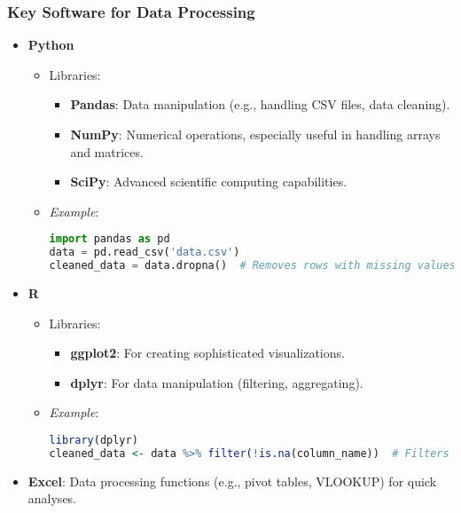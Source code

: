 \documentclass[aspectratio=169]{beamer}
\begin{document}
\begin{frame}[fragile]
    \frametitle{Key Software for Data Processing}
    \begin{itemize}
        \item \textbf{Python}
            \begin{itemize}
                \item Libraries:
                    \begin{itemize}
                        \item \textbf{Pandas}: Data manipulation (e.g., handling CSV files, data cleaning).
                        \item \textbf{NumPy}: Numerical operations, especially useful in handling arrays and matrices.
                        \item \textbf{SciPy}: Advanced scientific computing capabilities.
                    \end{itemize}
                \item \textit{Example}:
                \begin{lstlisting}[language=Python]
import pandas as pd
data = pd.read_csv('data.csv')
cleaned_data = data.dropna()  # Removes rows with missing values
                \end{lstlisting}
            \end{itemize}
        
        \item \textbf{R}
            \begin{itemize}
                \item Libraries:
                    \begin{itemize}
                        \item \textbf{ggplot2}: For creating sophisticated visualizations.
                        \item \textbf{dplyr}: For data manipulation (filtering, aggregating).
                    \end{itemize}
                \item \textit{Example}:
                \begin{lstlisting}[language=R]
library(dplyr)
cleaned_data <- data %>% filter(!is.na(column_name))  # Filters out NA values
                \end{lstlisting}
            \end{itemize}

        \item \textbf{Excel}: Data processing functions (e.g., pivot tables, VLOOKUP) for quick analyses.
    \end{itemize}
\end{frame}
\end{document}
